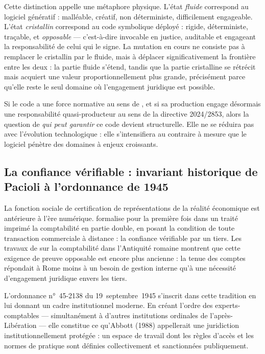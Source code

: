 \documentclass[12pt,a4paper]{article}
\begin{document}
Cette distinction appelle une métaphore physique. L'état \emph{fluide} correspond au logiciel génératif : malléable, créatif, non déterministe, difficilement engageable. L'état \emph{cristallin} correspond au code symbolique déployé : rigide, déterministe, traçable, et \emph{opposable} — c'est-à-dire invocable en justice, auditable et engageant la responsabilité de celui qui le signe. La mutation en cours ne consiste pas à remplacer le cristallin par le fluide, mais à déplacer significativement la frontière entre les deux : la partie fluide s'étend, tandis que la partie cristalline se rétrécit mais acquiert une valeur proportionnellement plus grande, précisément parce qu'elle reste le seul domaine où l'engagement juridique est possible.

Si le code a une force normative au sens de \textcite{lessig1999}, et si sa production engage désormais une responsabilité quasi-producteur au sens de la directive 2024/2853, alors la question de \emph{qui peut garantir} ce code devient structurelle. Elle ne se réduira pas avec l'évolution technologique : elle s'intensifiera au contraire à mesure que le logiciel pénètre des domaines à enjeux croissants.

\subsection{La confiance vérifiable : invariant historique de Pacioli à l'ordonnance de 1945}

La fonction sociale de certification de représentations de la réalité économique est antérieure à l'ère numérique. \textcite{pacioli1494} formalise pour la première fois dans un traité imprimé la comptabilité en partie double, en posant la condition de toute transaction commerciale à distance : la confiance vérifiable par un tiers. Les travaux de \textcite{minaud2006} sur la comptabilité dans l'Antiquité romaine montrent que cette exigence de preuve opposable est encore plus ancienne : la tenue des comptes répondait à Rome moins à un besoin de gestion interne qu'à une nécessité d'engagement juridique envers les tiers.

L'ordonnance n°~45-2138 du 19~septembre~1945 \parencite{ordonnance1945} s'inscrit dans cette tradition en lui donnant un cadre institutionnel moderne. En créant l'ordre des experts-comptables — simultanément à d'autres institutions ordinales de l'après-Libération — elle constitue ce qu'Abbott (1988) appellerait une juridiction institutionnellement protégée : un espace de travail dont les règles d'accès et les normes de pratique sont définies collectivement et sanctionnées publiquement.
\end{document}
